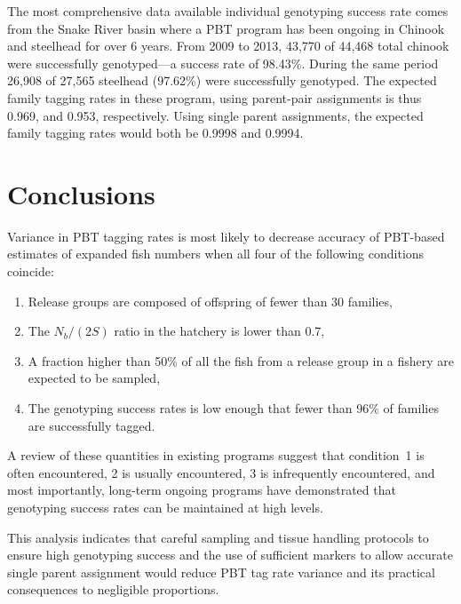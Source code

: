 \documentclass[11pt]{article}
\begin{document}
The most comprehensive data available individual genotyping success rate comes from the Snake River basin where a PBT program has been 
ongoing in Chinook and steelhead for over 6 years.  From 2009 to 2013, 43,770 of 44,468 total chinook were successfully genotyped---a success
rate of 98.43\%.  During the same period 26,908 of 27,565 steelhead (97.62\%) were successfully genotyped.  The expected family tagging
rates in these program, using parent-pair assignments is thus 0.969, and 0.953, respectively.  Using single parent assignments, 
the expected family tagging rates would both be 0.9998 and 0.9994.  

\section{Conclusions}

Variance in PBT tagging rates is most likely to decrease accuracy of PBT-based estimates of expanded fish numbers
when all four of the following conditions coincide:
\begin{enumerate}
\item Release groups are composed of offspring of fewer than 30 families,
\item The $N_b/(2S)$ ratio in the hatchery is lower than 0.7,
\item A fraction higher than 50\% of all the fish from a release group in a fishery are expected to be sampled,
\item The genotyping success rates is low enough that fewer than 96\% of families are successfully tagged.
\end{enumerate}
A review of these quantities in existing programs suggest that condition~1 is often encountered, 2 is usually encountered, 3 is infrequently 
encountered, and most importantly, long-term ongoing programs have demonstrated that genotyping success rates can be maintained 
at high levels.

This analysis indicates that careful sampling and tissue handling protocols to ensure high genotyping success and the use of sufficient markers to allow
accurate single parent assignment would reduce PBT tag rate variance and its practical consequences to negligible proportions.



 
\end{document}
